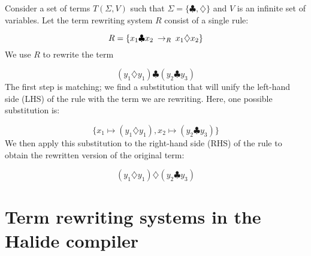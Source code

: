 Consider a set of terms $T(\Sigma, V)$ such that $\Sigma = \{\clubsuit, \diamondsuit\}$ and $V$ is an infinite set of variables. Let the term rewriting system $R$ consist of a single rule:

\[ R = \{ x_1 \clubsuit x_2 \:\rightarrow_{R}\: x_1 \diamondsuit x_2 \} \]
We use $R$ to rewrite the term

\[ 
(y_1 \diamondsuit y_1) \clubsuit (y_2 \clubsuit y_3)
\]
The first step is matching; we find a substitution that will unify the left-hand side (LHS) of the rule with the term we are rewriting. Here, one possible substitution is:

\[
\{ x_1 \mapsto (y_1 \diamondsuit y_1), x_2 \mapsto (y_2 \clubsuit y_3) \}
\]
We then apply this substitution to the right-hand side (RHS) of the rule to obtain the rewritten version of the original term:

\[ 
(y_1 \diamondsuit y_1) \diamondsuit (y_2 \clubsuit y_3)
\]


\section{Term rewriting systems in the Halide compiler}



%
%
%
%
%

